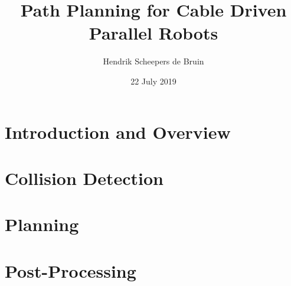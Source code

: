 \documentclass{beamer}
\title{Path Planning for Cable Driven Parallel Robots}
\author{Hendrik Scheepers de Bruin}
\institute{École Centrale de Nantes, Università degli Studi di Genova}
\date{22 July 2019}
\begin{document}
	\frame{\titlepage}
	\section{Introduction and Overview}
		
	\section{Collision Detection}
		
	\section{Planning}
		
	\section{Post-Processing}
		
\end{document}
